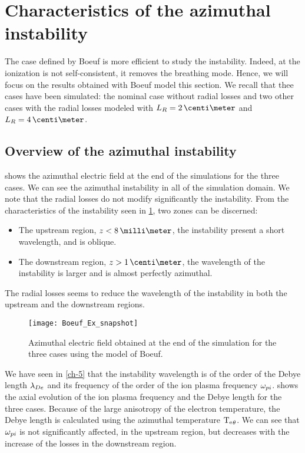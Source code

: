 
\section{Characteristics of the azimuthal instability}


The case defined by Boeuf is more efficient to  study the instability.
Indeed, at the ionization is not self-consistent, it removes the breathing mode.
Hence, we will focus on the results obtained with Boeuf model this section.
We recall that thee cases have been simulated\string: the nominal case without radial losses and two other cases with the radial losses modeled with $L_R=2\,\centi\meter$ and $L_R=4\,\centi\meter$.

\subsection{Overview of the azimuthal instability} \label{subsec-label}
 shows the azimuthal electric field at the end of the simulations for the three cases.
We can see the azimuthal instability in all of the simulation domain.
We note that the radial losses do not modify significantly the instability.
From the characteristics of the instability seen in \cref{fig-snapshots}, two zones can be discerned\string:
\begin{itemize}
  \item The upstream region, $z < 8 \,\milli\meter$, the instability present a short wavelength, and is oblique.
  \item The downstream region, $z > 1\,\centi\meter$, the wavelength of the instability is larger and is almost perfectly azimuthal.
\end{itemize}
The radial losses seems to reduce the wavelength of the instability in both the upstream and the downstream regions.


\begin{figure}[hbtp]
  \centering
  \texttt{[image: Boeuf\_Ex\_snapshot]}
  \caption{Azimuthal electric field obtained at the end of the simulation for the three cases using the model of Boeuf.}
  \label{fig-snapshots}
\end{figure}

We have seen in \cref{ch-5} that the instability wavelength is of the order of the Debye length $\lambda_{De}$ and its frequency of the order of the ion plasma frequency $\omega_{pi}$.
 shows the axial evolution of the ion plasma frequency and the Debye length for the three cases.
Because of the large anisotropy of the electron temperature, the Debye length is calculated using the azimuthal temperature $\mathrm{T_e}_{\theta}$.
We can see that $\omega_{pi}$ is not significantly affected, in the upstream region, but decreases with the increase of the losses in the downstream region.


